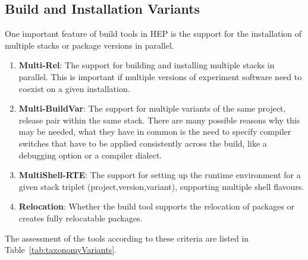 \documentclass[12pt,a4paper]{article}
\begin{document}
\subsection{Build and Installation Variants}
One important feature of build tools in HEP is the support for the installation of multiple stacks or package versions in parallel.
\begin{enumerate}
\item \textbf{Multi-Rel}: The support for building and installing multiple stacks in parallel. This is important if multiple versions of experiment software need to coexist on a given installation.
\item \textbf{Multi-BuildVar}: The support for multiple variants of the same project, release pair within the same stack. There are many possible reasons why this may be needed, what they have in common is the need to specify compiler switches that have to be applied consistently across the build, like a debugging option or a compiler dialect.
\item \textbf{MultiShell-RTE}: The support for setting up the runtime environment for a given stack triplet (project,version,variant), supporting multiple shell flavours.
\item \textbf{Relocation}: Whether the build tool supports the relocation of packages or creates fully relocatable packages.
\end{enumerate}

The assessment of the tools according to these criteria are listed in Table~\ref{tab:taxonomyVariants}.
\end{document}
